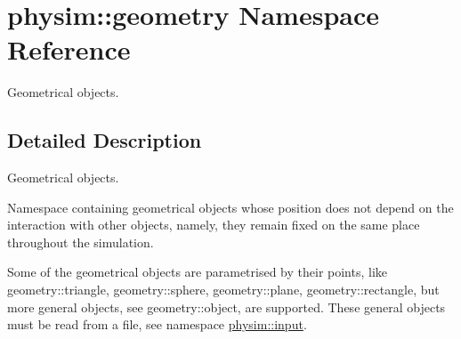 \hypertarget{namespacephysim_1_1geometry}{}\section{physim\+:\+:geometry Namespace Reference}
\label{namespacephysim_1_1geometry}


Geometrical objects.  




\subsection{Detailed Description}
Geometrical objects. 

Namespace containing geometrical objects whose position does not depend on the interaction with other objects, namely, they remain fixed on the same place throughout the simulation.

Some of the geometrical objects are parametrised by their points, like geometry\+::triangle, geometry\+::sphere, geometry\+::plane, geometry\+::rectangle, but more general objects, see geometry\+::object, are supported. These general objects must be read from a file, see namespace \hyperlink{namespacephysim_1_1input}{physim\+::input}. 